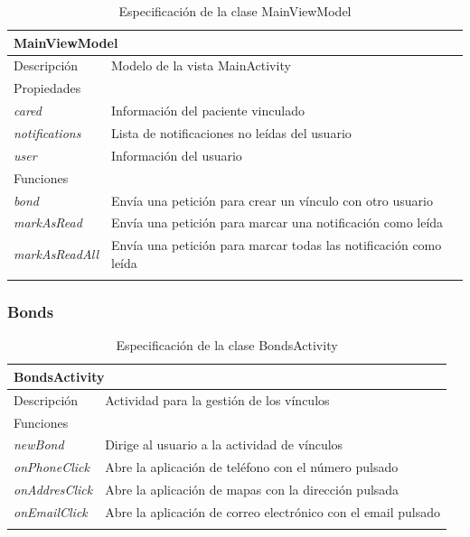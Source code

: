 \vspace{-20pt}
\begin{longtable}{|p{} p{}|}
    \hline
    \multicolumn{2}{|l|}{MainViewModel} \\ \hline \hline
    Descripción      & Modelo de la vista MainActivity \\ \hline
    \multicolumn{2}{|l|}{Propiedades} \\
    \emph{cared}  & Información del paciente vinculado  \\
    \emph{notifications}  & Lista de notificaciones no leídas del usuario  \\
    \emph{user}  & Información del usuario  \\ \hline
    \multicolumn{2}{|l|}{Funciones} \\
    \emph{bond}  & Envía una petición para crear un vínculo con otro usuario \\
    \emph{markAsRead}  & Envía una petición para marcar una notificación como leída \\ 
    \emph{markAsReadAll}  & Envía una petición para marcar todas las notificación como leída \\ \hline
    \caption{Especificación de la clase MainViewModel}
    \label{class:app:main_view_model}
\end{longtable}

\vspace{-30pt}
\subsubsection{Bonds}

\vspace{-5pt}
\begin{longtable}{|p{} p{}|}
    \hline
    \multicolumn{2}{|l|}{BondsActivity} \\ \hline \hline
    Descripción      & Actividad para la gestión de los vínculos \\ \hline
    \multicolumn{2}{|l|}{Funciones} \\
    \emph{newBond}  & Dirige al usuario a la actividad de vínculos  \\
    \emph{onPhoneClick}  & Abre la aplicación de teléfono con el número pulsado  \\ 
    \emph{onAddresClick}  & Abre la aplicación de mapas con la dirección pulsada \\ 
    \emph{onEmailClick}  & Abre la aplicación de correo electrónico con el email pulsado \\ \hline
    \caption{Especificación de la clase BondsActivity}
    \label{class:app:bonds_activity}
\end{longtable}

